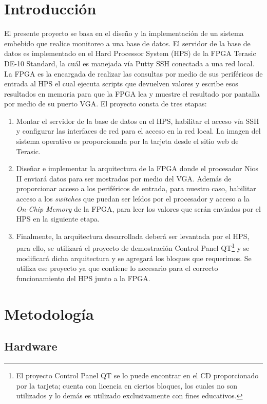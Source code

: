 \documentclass[conference]{IEEEtran}
\begin{document}
\section{Introducción}\label{sec:int}
El presente proyecto se basa en el diseño y la implementación de un sistema embebido que realice monitoreo a una base de datos. El servidor de la base de datos es implementado en el Hard Processor System (HPS) de la FPGA Terasic DE-10 Standard, la cuál es manejada vía Putty SSH conectada a una red local. La FPGA es la encargada de realizar las consultas por medio de sus periféricos de entrada al HPS el cual ejecuta scripts que devuelven valores y escribe esos resultados en memoria para que la FPGA lea y muestre el resultado por pantalla por medio de su puerto VGA. El proyecto consta de tres etapas:
\begin{enumerate}
  \item Montar el servidor de la base de datos en el HPS, habilitar el acceso vía SSH y configurar las interfaces de red para el acceso en la red local. La imagen del sistema operativo es proporcionada por la tarjeta desde el sitio web de Terasic.
  \item Diseñar e implementar la arquitectura de la FPGA donde el procesador Nios II enviará datos para ser mostrados por medio del VGA. Además de proporcionar acceso a los periféricos de entrada, para nuestro caso, habilitar acceso a los \textit{switches} que puedan ser leídos por el procesador y acceso a la \textit{On-Chip Memory} de la FPGA, para leer los valores que serán enviados por el HPS en la siguiente etapa.
  \item Finalmente, la arquitectura desarrollada deberá ser levantada por el HPS, para ello, se utilizará el proyecto de demostración Control Panel QT\footnote{El proyecto Control Panel QT se lo puede encontrar en el CD proporcionado por la tarjeta; cuenta con licencia en ciertos bloques, los cuales no son utilizados y lo demás es utilizado exclusivamente con fines educativos.} y se modificará dicha arquitectura y se agregará los bloques que requerimos. Se utiliza ese proyecto ya que contiene lo necesario para el correcto funcionamiento del HPS junto a la FPGA.
\end{enumerate}
\section{Metodología}
\subsection{Hardware}
\end{document}
